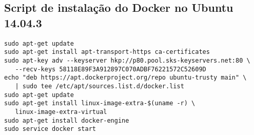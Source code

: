 \documentclass[
	12pt,				%
	openright,			%
	oneside,			%
	a4paper,			%
	english,			%
	french,				%
	spanish,			%
	brazil,				%
	]{abntex2}
\begin{document}
\postextual




%
%


\begin{apendicesenv}

\partapendices

\chapter{Script de instalação do Docker no Ubuntu 14.04.3}

\label{apendice-script-install-docker}

\begin{lstlisting}
sudo apt-get update
sudo apt-get install apt-transport-https ca-certificates
sudo apt-key adv --keyserver hkp://p80.pool.sks-keyservers.net:80 \
   --recv-keys 58118E89F3A912897C070ADBF76221572C52609D
echo "deb https://apt.dockerproject.org/repo ubuntu-trusty main" \
   | sudo tee /etc/apt/sources.list.d/docker.list
sudo apt-get update
sudo apt-get install linux-image-extra-$(uname -r) \
   linux-image-extra-virtual
sudo apt-get install docker-engine
sudo service docker start
\end{lstlisting}

\end{apendicesenv}








\phantompart

\printindex
\end{document}
